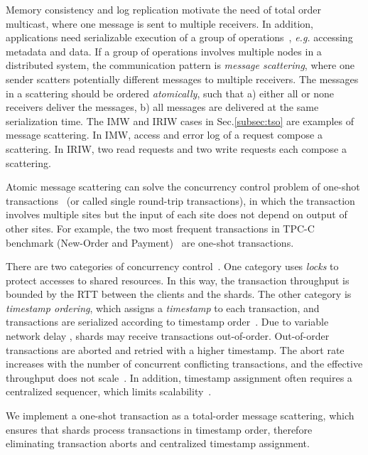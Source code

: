 Memory consistency and log replication motivate the need of total order multicast, where one message is sent to multiple receivers.
In addition, applications need serializable execution of a group of operations~\cite{cheriton1994understanding}, \textit{e.g.} accessing metadata and data.
If a group of operations involves multiple nodes in a distributed system, the communication pattern is \textit{message scattering}, where one sender scatters potentially different messages to multiple receivers.
The messages in a scattering should be ordered \textit{atomically}, such that a) either all or none receivers deliver the messages, b) all messages are delivered at the same serialization time.
The IMW and IRIW cases in Sec.\ref{subsec:tso} are examples of  message scattering.
In IMW, access and error log of a request compose a scattering.
In IRIW, two read requests and two write requests each compose a scattering.

Atomic message scattering can solve the concurrency control problem of one-shot transactions~\cite{kallman2008h} (or called single round-trip transactions), in which the transaction involves multiple sites but the input of each site does not depend on output of other sites.
For example, the two most frequent transactions in TPC-C benchmark (New-Order and Payment)~\cite{tpcc} are one-shot transactions.

 There are two categories of concurrency control~\cite{bernstein1981concurrency}.
One category uses \textit{locks} to protect accesses to shared resources.
In this way, the transaction throughput is bounded by the RTT between the clients and the shards.
The other category is \textit{timestamp ordering}, which assigns a \textit{timestamp} to each transaction, and transactions are serialized according to timestamp order~\cite{kung1981optimistic,bernstein1983multiversion}.
Due to variable network delay , shards may receive transactions out-of-order.
Out-of-order transactions are aborted and retried with a higher timestamp.
The abort rate increases with the number of concurrent conflicting transactions, and the effective throughput does not scale~\cite{yu2014staring}.
In addition, timestamp assignment often requires a centralized sequencer, which limits scalability~\cite{yu2014staring}.

We implement a one-shot transaction as a total-order message scattering, which ensures that shards process transactions in timestamp order, therefore eliminating transaction aborts and centralized timestamp assignment.

